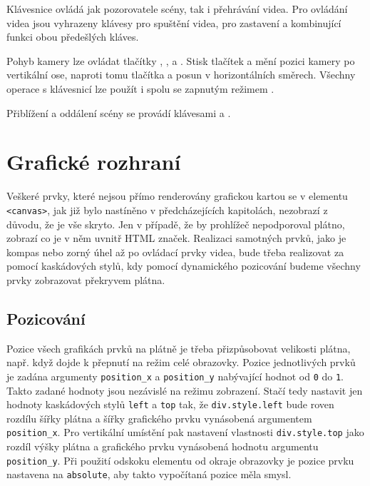 Klávesnice ovládá jak pozorovatele scény, tak i přehrávání videa. Pro ovládání videa jsou vyhrazeny klávesy  pro spuštění videa,  pro zastavení a  kombinující funkci obou předešlých kláves.

Pohyb kamery lze ovládat tlačítky , ,   a  . Stisk tlačítek  a  mění pozici kamery po vertikální ose, naproti tomu tlačítka  a   posun v horizontálních směrech. Všechny operace s klávesnicí lze použít i spolu se zapnutým režimem  .

Přiblížení a oddálení scény se provádí klávesami \keystroke{+} a \keystroke{-}.

\newpage

\section{Grafické rozhraní}
Veškeré prvky, které nejsou přímo renderovány grafickou kartou se v elementu \texttt{<canvas>}, jak již bylo nastíněno v předcházejících kapitolách,  nezobrazí z důvodu, že je vše skryto. Jen v případě, že by prohlížeč nepodporoval plátno, zobrazí co je v něm uvnitř HTML značek. Realizaci samotných prvků, jako je kompas nebo zorný úhel až po ovládací prvky videa, bude třeba realizovat za pomocí kaskádových stylů, kdy pomocí dynamického pozicování budeme všechny prvky zobrazovat překryvem plátna.

\subsection*{Pozicování}
Pozice všech grafikách prvků na plátně je třeba přizpůsobovat velikosti plátna, např. když dojde k přepnutí na režim celé obrazovky. Pozice jednotlivých prvků je zadána argumenty \texttt{position\_x} a \texttt{position\_y} nabývající hodnot od \texttt{0} do \texttt{1}. Takto zadané hodnoty jsou nezávislé na režimu zobrazení. Stačí tedy nastavit jen hodnoty kaskádových stylů \texttt{left} a \texttt{top} tak, že \texttt{div.style.left} bude roven rozdílu šířky plátna a šířky grafického prvku vynásobená argumentem \texttt{position\_x}. Pro vertikální umístění pak nastavení vlastnosti \texttt{div.style.top} jako rozdíl výšky plátna a grafického prvku vynásobená  hodnotu argumentu \texttt{position\_y}. Při použití odskoku elementu od okraje obrazovky je pozice prvku nastavena na \texttt{absolute}, aby takto vypočítaná pozice měla smysl. 




